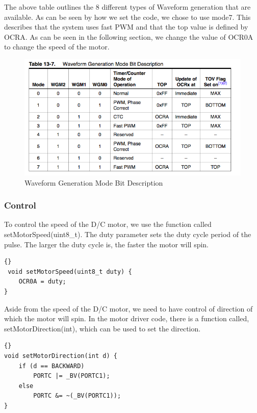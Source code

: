The above table outlines the 8 different types of  Waveform generation that are available. As can be seen by how we set the code, we chose to use mode7. This describes that the system uses fast PWM and that the top value is defined by OCRA.  As can be seen in the following section, we change the value of OCR0A to  change the speed of the motor.

\begin{figure}[h]
  \begin{center}
    \includegraphics[width=125mm]{imageSources/waveformGenerationTable.png}
  \end{center}
  \caption{Waveform Generation Mode Bit Description} 
  \label{waveformGenerationTable}
\end{figure}

\subsubsection{Control}
To control the speed of the D/C motor, we use the function called setMotorSpeed(uint8\_t). The duty parameter sets the duty cycle period of the pulse. The larger the duty cycle is, the faster the motor will spin. 

\lstset{language=c}
\lstset{commentstyle=\textit}
\begin{lstlisting}[frame=trbl]{}
 void setMotorSpeed(uint8_t duty) {
	OCR0A = duty;
}
\end{lstlisting}

Aside from the speed of the D/C motor, we need to have control of direction of which the motor will spin. In the motor driver code, there is a function called, setMotorDirection(int), which can be used to set the direction. 

\lstset{language=c}
\lstset{commentstyle=\textit}
\begin{lstlisting}[frame=trbl]{}
void setMotorDirection(int d) {
    if (d == BACKWARD)
        PORTC |= _BV(PORTC1);
    else
        PORTC &= ~(_BV(PORTC1));
}
\end{lstlisting}

